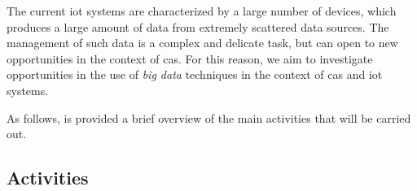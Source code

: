 \documentclass[12pt]{article}
\begin{document}
The current \ac{iot} systems are characterized by a large number of devices,
which produces a large amount of data from extremely scattered data sources.
%
The management of such data is a complex and delicate task,
but can open to new opportunities in the context of \ac{cas}.
%
For this reason,
we aim to investigate opportunities in the use of \emph{big data} techniques in the context of \ac{cas} and \ac{iot} systems.


%



As follows, is provided a brief overview of the main activities that will be carried out.

\subsection{Activities}\label{subsec:activities}
\end{document}
